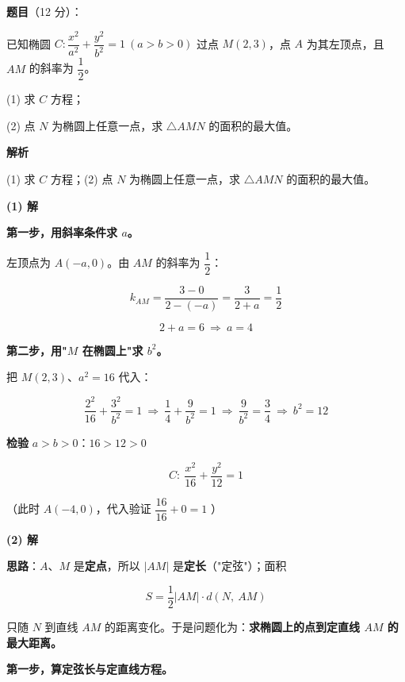 \begin{answer}

\textbf{题目}（12 分）：

已知椭圆 $C:\dfrac{x^{2}}{a^{2}}+\dfrac{y^{2}}{b^{2}}=1\ (a>b>0)$ 过点 $M(2,3)$，点 $A$ 为其左顶点，且 $AM$ 的斜率为 $\dfrac12$。

  (1) 求 $C$ 方程；

  (2) 点 $N$ 为椭圆上任意一点，求 $\triangle AMN$ 的面积的最大值。

\textbf{解析}

  (1) 求 $C$ 方程；(2) 点 $N$ 为椭圆上任意一点，求 $\triangle AMN$ 的面积的最大值。

\par\medskip

\textbf{(1) 解}

\textbf{第一步，用斜率条件求 $a$。}

左顶点为 $A(-a,0)$。由 $AM$ 的斜率为 $\dfrac12$：

\nopagebreak[4]
\[k_{AM}=\frac{3-0}{2-(-a)}=\frac3{2+a}=\frac12\]

\nopagebreak[4]
\[2+a=6\ \Longrightarrow\ a=4\]

\textbf{第二步，用"$M$ 在椭圆上"求 $b^{2}$。}

把 $M(2,3)$、$a^{2}=16$ 代入：

\nopagebreak[4]
\[\frac{2^{2}}{16}+\frac{3^{2}}{b^{2}}=1\ \Longrightarrow\ \frac14+\frac9{b^{2}}=1\ \Longrightarrow\ \frac9{b^{2}}=\frac34\ \Longrightarrow\ b^{2}=12\]

\textbf{检验} $a>b>0$：$16>12>0$ 

\nopagebreak[4]
\[\boxed{C:\ \frac{x^{2}}{16}+\frac{y^{2}}{12}=1}\]

（此时 $A(-4,0)$，代入验证 $\dfrac{16}{16}+0=1$ ）

\par\medskip

\textbf{(2) 解}

\textbf{思路}：$A$、$M$ 是\textbf{定点}，所以 $|AM|$ 是\textbf{定长}（"定弦"）；面积

\nopagebreak[4]
\[S=\frac12|AM|\cdot d(N,\ AM)\]

只随 $N$ 到直线 $AM$ 的距离变化。于是问题化为：\textbf{求椭圆上的点到定直线 $AM$ 的最大距离。}

\textbf{第一步，算定弦长与定直线方程。}


\end{answer}
